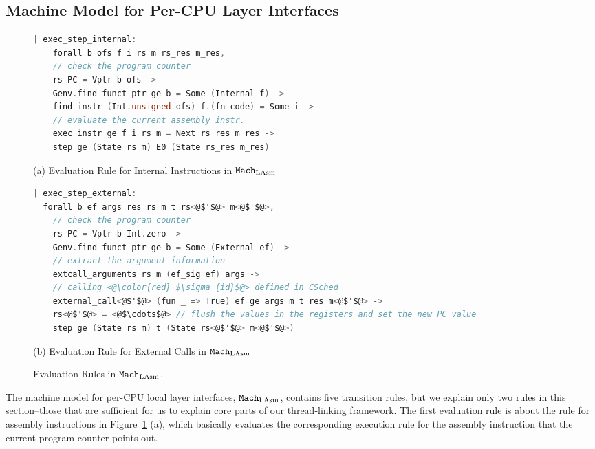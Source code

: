 \subsection{Machine Model for Per-CPU Layer Interfaces}
\label{chapter:linking:subsec:cpu-local-layer-interfaces}


\begin{figure}
\begin{lstlisting}[language=C, deletekeywords={unsigned, struct}]
| exec_step_internal:
    forall b ofs f i rs m rs_res m_res,
    // check the program counter
    rs PC = Vptr b ofs ->
    Genv.find_funct_ptr ge b = Some (Internal f) ->
    find_instr (Int.unsigned ofs) f.(fn_code) = Some i ->
    // evaluate the current assembly instr.         
    exec_instr ge f i rs m = Next rs_res m_res ->
    step ge (State rs m) E0 (State rs_res m_res)
\end{lstlisting}
\begin{center}
(a) Evaluation Rule for Internal Instructions in ${\mathrm{\texttt{Mach}}}_{\mathrm{LAsm}}$
\end{center}
\begin{lstlisting}[language=C]
| exec_step_external:
  forall b ef args res rs m t rs<@$'$@> m<@$'$@>,
    // check the program counter  
    rs PC = Vptr b Int.zero ->
    Genv.find_funct_ptr ge b = Some (External ef) ->
    // extract the argument information
    extcall_arguments rs m (ef_sig ef) args ->
    // calling <@\color{red} $\sigma_{id}$@> defined in CSched
    external_call<@$'$@> (fun _ => True) ef ge args m t res m<@$'$@> ->
    rs<@$'$@> = <@$\cdots$@> // flush the values in the registers and set the new PC value
    step ge (State rs m) t (State rs<@$'$@> m<@$'$@>)
\end{lstlisting}
\begin{center}
(b) Evaluation Rule for External Calls in ${\mathrm{\texttt{Mach}}}_{\mathrm{LAsm}}$
\end{center}
\caption{Evaluation Rules in ${\mathrm{\texttt{Mach}}}_{\mathrm{LAsm}}$.}
\label{fig:chapter:linking:eval-rule-in-lasm}
\end{figure}

The machine model for per-CPU local layer interfaces,
${\mathrm{\texttt{Mach}}}_{\mathrm{LAsm}}$, contains five transition rules, 
but we explain only two rules in this section--those
that are sufficient for us to explain core parts of our thread-linking framework.
The first evaluation rule is 
about the rule for assembly instructions in Figure~\ref{fig:chapter:linking:eval-rule-in-lasm} (a), 
which basically evaluates the corresponding execution 
rule for the assembly instruction that the current program counter points out. 

